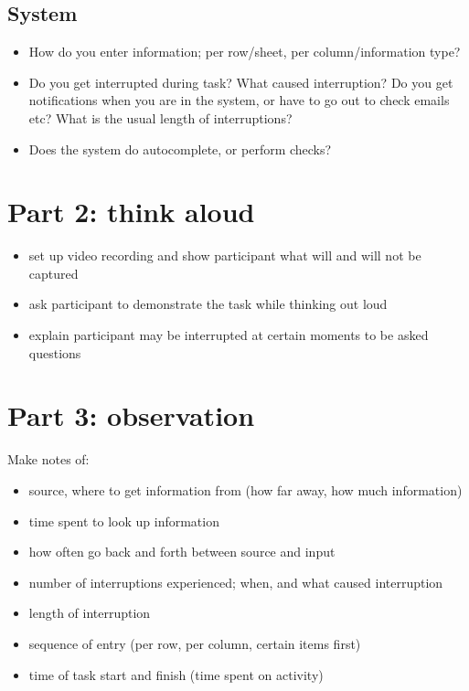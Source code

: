 \subsection{System}
\begin{itemize}
\item How do you enter information; per row/sheet, per column/information type?
\item Do you get interrupted during task? What caused interruption? Do you get notifications when you are in the system, or have to go out to check emails etc? What is the usual length of interruptions?
\item Does the system do autocomplete, or perform checks?
\end{itemize}

\section{Part 2: think aloud}
\begin{itemize}
\item set up video recording and show participant what will and will not be captured
\item ask participant to demonstrate the task while thinking out loud
\item explain participant may be interrupted at certain moments to be asked questions
\end{itemize}

\section{Part 3: observation}
Make notes of:
\begin{itemize}
\item source, where to get information from (how far away, how much information)
\item time spent to look up information
\item how often go back and forth between source and input
\item number of interruptions experienced; when, and what caused interruption
\item length of interruption
\item sequence of entry (per row, per column, certain items first)
\item time of task start and finish (time spent on activity)
\end{itemize}

